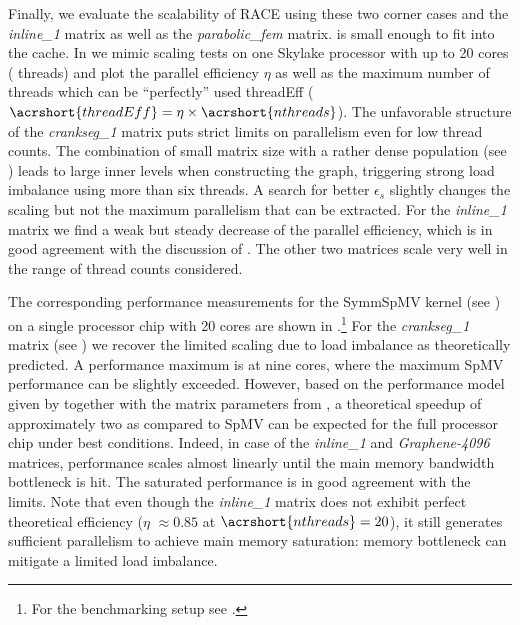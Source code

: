 Finally, we evaluate the scalability of RACE using these two corner cases and
the \emph{inline\_1} matrix as well as the \emph{parabolic\_fem} matrix.
 
is small enough to fit into the cache.  In  we
mimic scaling tests on one Skylake processor with up to 20 cores (\ie
threads) and plot the parallel efficiency $\eta$ as well as the maximum number
of threads which can be ``perfectly'' used \acrshort{threadEff} (\ie
$\acrshort{threadEff} = \eta\times\acrshort{nthreads}$).  The unfavorable structure
of the \emph{crankseg\_1} matrix puts strict limits on parallelism even for low
thread counts.  The combination of small matrix size with a rather dense
population (see ) leads to large inner levels when
constructing the graph, triggering strong load imbalance  
 using more than six threads.
A search for better $\epsilon_s$ slightly changes the 
scaling  but not the maximum parallelism that can be extracted. 
For the \emph{inline\_1} matrix we find a weak but steady decrease of the parallel
efficiency, which is in good agreement with the discussion
of . The other two matrices scale very well in the
range of thread counts considered.


The corresponding performance measurements for the \acrshort{SymmSpMV} kernel
(see ) on a single \SKX processor chip with 20 cores are
shown in .\footnote{For the benchmarking setup
see .}
For the \emph{crankseg\_1} matrix (see ) we recover
the limited scaling due to load imbalance as theoretically predicted. A
performance maximum is at nine cores, where the maximum \acrshort{SpMV}
performance can be slightly exceeded. However, based on the \roofline performance
model given by  together with
the matrix parameters from , a theoretical speedup of
approximately two as compared to \acrshort{SpMV} can be expected for the full
processor chip under best conditions.
Indeed, in case of the \emph{inline\_1} and \emph{Graphene-4096}
matrices, performance
scales almost linearly until the main memory bandwidth bottleneck is hit. The
saturated performance is in good agreement with the \roofline limits.
Note that even though the \emph{inline\_1} matrix does not exhibit
perfect theoretical efficiency ($\eta$ $\approx 0.85$ at
$\acrshort{nthreads}=20$), it still generates sufficient parallelism to achieve
main memory saturation:   memory bottleneck can mitigate
a limited load imbalance.

